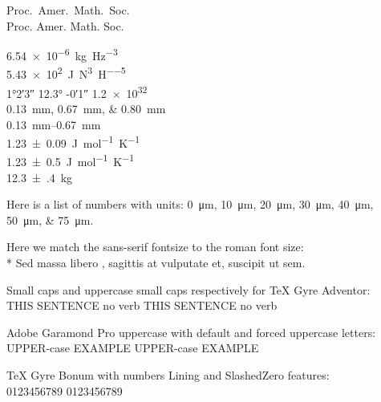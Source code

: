\documentclass[draft=false]{book}
\begin{document}
Proc.\ Amer.\ Math.\ Soc.\\
Proc. Amer. Math. Soc.

\SI{6.54e-6}{\kilogram\per\hertz\cubed}\\
\SI{5.43e2}{\joule\per\newton\cubed\per\henry\tothe{5}} \\
\ang{1;2;3} \ang{12.3} \ang{;-0;1} \num{1.2e32} \\
\SIlist{0.13;0.67;0.80}{\milli\metre}\\
\SIrange{0.13}{0.67}{\milli\metre}\\
\SI[mode=text]{1.23+-0.09}{J.mol^{-1}.K^{-1}}\\
\SI[mode=text,separate-uncertainty = true]{1.23+-0.5}{J.mol^{-1}.K^{-1}}\\
\SI[multi-part-units = single]{12.3(4)}{\kilo\gram}

Here is a list of numbers with units: \SIlist{0; 10; 20; 30; 40; 50; 75}{\micro\meter}.

Here we match the sans-serif fontsize to the roman font size:\\*
{\sffamily Sed massa libero}%
, sagittis at vulputate et, suscipit ut sem. 


Small caps and uppercase small caps respectively for TeX Gyre Adventor:\\
{
 THIS SENTENCE no verb \hspace{2em}
 THIS SENTENCE no verb\\
}

Adobe Garamond Pro uppercase with default and forced uppercase letters:\\
{
 UPPER-case EXAMPLE \hspace{2em}
 UPPER-case EXAMPLE\\
}

TeX Gyre Bonum  with numbers Lining and SlashedZero features:\\
{
 0123456789\hspace{2em}
 0123456789 \\
}
\end{document}
